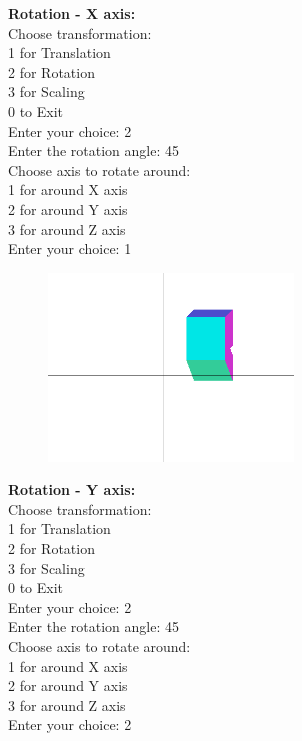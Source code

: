 \documentclass[9pt,letterpaper]{article}
\begin{document}
\newpage
\textbf{Rotation - X axis:}\\

Choose transformation:   \\
1 for Translation        \\
2 for Rotation           \\
3 for Scaling            \\
0 to Exit                \\
Enter your choice: 2     \\

Enter the rotation angle: 45 \\
Choose axis to rotate around:\\
1 for around X axis          \\
2 for around Y axis          \\
3 for around Z axis          \\
Enter your choice: 1         \\

\begin{figure}[h]
    \centering
    \includegraphics[height=5cm]{Outputs/OP2.png}
\end{figure}

\newpage
\textbf{Rotation - Y axis:}\\

Choose transformation:   \\
1 for Translation        \\
2 for Rotation           \\
3 for Scaling            \\
0 to Exit                \\
Enter your choice: 2     \\

Enter the rotation angle: 45 \\
Choose axis to rotate around:\\
1 for around X axis          \\
2 for around Y axis          \\
3 for around Z axis          \\
Enter your choice: 2         \\
\end{document}
